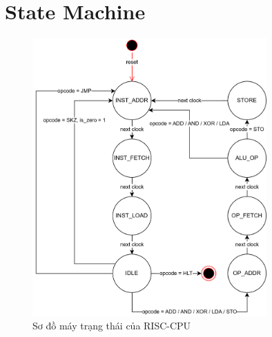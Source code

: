     \section{State Machine}
        \begin{figure}[h]
            \centering
            \includegraphics[width=0.8\textwidth]{graphics/RISC-CPU_FSM.drawio.png}
            \caption{Sơ đồ máy trạng thái của RISC-CPU}
        \end{figure}

